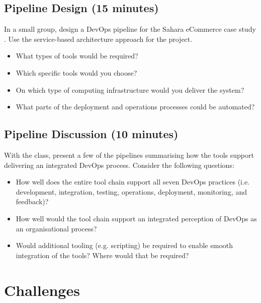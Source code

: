 \documentclass{csse4400}
\begin{document}

\subsection*{Pipeline Design (15 minutes)}
In a small group, design a DevOps pipeline for the Sahara eCommerce case study \cite{service-based-slides}.
Use the service-based architecture approach for the project.
\begin{itemize}
    \item What types of tools would be required?
    \item Which specific tools would you choose?
    \item On which type of computing infrastructure would you deliver the system?
    \item What parts of the deployment and operations processes could be automated?
\end{itemize}

\subsection*{Pipeline Discussion (10 minutes)}
With the class, present a few of the pipelines summarising how the tools support delivering an integrated DevOps process.
Consider the following questions:
\begin{itemize}
    \item How well does the entire tool chain support all seven DevOps practices
          (i.e. development, integration, testing, operations, deployment, monitoring, and feedback)?
    \item How well would the tool chain support an integrated perception of DevOps as an organisational process?
    \item Would additional tooling (e.g. scripting) be required to enable smooth integration of the tools?
          Where would that be required?
\end{itemize}


\section{Challenges}
\end{document}
